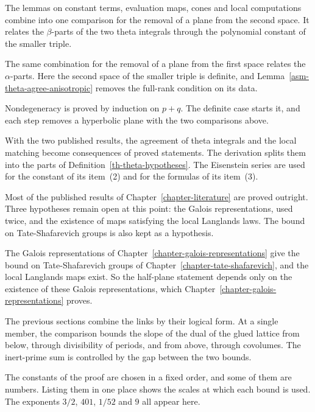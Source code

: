 The lemmas on constant terms, evaluation maps, cones and local computations
combine into one comparison for the removal of a plane from the second space.
It relates the $\beta$-parts of the two theta integrals through the polynomial
constant of the smaller triple.

The same combination for the removal of a plane from the first space relates
the $\alpha$-parts. Here the second space of the smaller triple is definite,
and Lemma~\ref{asm-theta-agree-anisotropic} removes the full-rank condition
on its data.

Nondegeneracy is proved by induction on $p+q$. The definite case starts it,
and each step removes a hyperbolic plane with the two comparisons above.

With the two published results, the agreement of theta integrals and the
local matching become consequences of proved statements. The derivation
splits them into the parts of Definition~\ref{th-theta-hypotheses}. The
Eisenstein series are used for the constant of its item~(2) and for the
formulas of its item~(3).

Most of the published results of Chapter~\ref{chapter-literature} are proved
outright. Three hypotheses remain open at this point: the Galois
representations, used twice, and the existence of maps satisfying the local
Langlands laws. The bound on Tate-Shafarevich groups is also kept as a
hypothesis.

The Galois representations of Chapter~\ref{chapter-galois-representations}
give the bound on Tate-Shafarevich groups of
Chapter~\ref{chapter-tate-shafarevich}, and the local Langlands maps exist.
So the half-plane statement depends only on the existence of these Galois
representations, which Chapter~\ref{chapter-galois-representations} proves.

The previous sections combine the links by their logical form. At a single
member, the comparison bounds the slope of the dual of the glued lattice from
below, through divisibility of periods, and from above, through covolumes. The
inert-prime sum is controlled by the gap between the two bounds.

The constants of the proof are chosen in a fixed order, and some of them are
numbers. Listing them in one place shows the scales at which each bound is
used. The exponents $3/2$, $401$, $1/52$ and $9$ all appear here.
